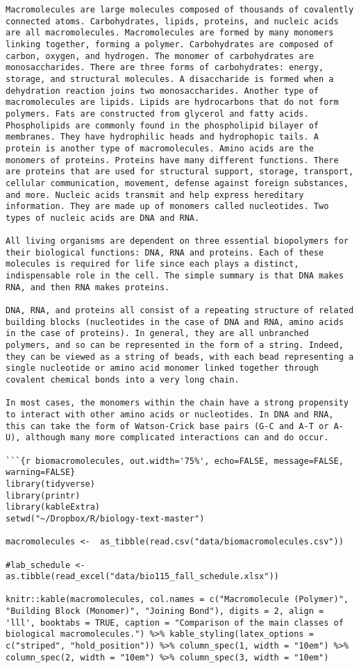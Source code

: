 \begin{verbatim}
Macromolecules are large molecules composed of thousands of covalently connected atoms. Carbohydrates, lipids, proteins, and nucleic acids are all macromolecules. Macromolecules are formed by many monomers linking together, forming a polymer. Carbohydrates are composed of carbon, oxygen, and hydrogen. The monomer of carbohydrates are monosaccharides. There are three forms of carbohydrates: energy, storage, and structural molecules. A disaccharide is formed when a dehydration reaction joins two monosaccharides. Another type of macromolecules are lipids. Lipids are hydrocarbons that do not form polymers. Fats are constructed from glycerol and fatty acids. Phospholipids are commonly found in the phospholipid bilayer of membranes. They have hydrophilic heads and hydrophopic tails. A protein is another type of macromolecules. Amino acids are the monomers of proteins. Proteins have many different functions. There are proteins that are used for structural support, storage, transport, cellular communication, movement, defense against foreign substances, and more. Nucleic acids transmit and help express hereditary information. They are made up of monomers called nucleotides. Two types of nucleic acids are DNA and RNA.

All living organisms are dependent on three essential biopolymers for their biological functions: DNA, RNA and proteins. Each of these molecules is required for life since each plays a distinct, indispensable role in the cell. The simple summary is that DNA makes RNA, and then RNA makes proteins.

DNA, RNA, and proteins all consist of a repeating structure of related building blocks (nucleotides in the case of DNA and RNA, amino acids in the case of proteins). In general, they are all unbranched polymers, and so can be represented in the form of a string. Indeed, they can be viewed as a string of beads, with each bead representing a single nucleotide or amino acid monomer linked together through covalent chemical bonds into a very long chain.

In most cases, the monomers within the chain have a strong propensity to interact with other amino acids or nucleotides. In DNA and RNA, this can take the form of Watson-Crick base pairs (G-C and A-T or A-U), although many more complicated interactions can and do occur.

```{r biomacromolecules, out.width='75%', echo=FALSE, message=FALSE, warning=FALSE}
library(tidyverse)
library(printr)        
library(kableExtra)
setwd("~/Dropbox/R/biology-text-master")

macromolecules <-  as_tibble(read.csv("data/biomacromolecules.csv"))

#lab_schedule <-  as.tibble(read_excel("data/bio115_fall_schedule.xlsx"))

knitr::kable(macromolecules, col.names = c("Macromolecule (Polymer)", "Building Block (Monomer)", "Joining Bond"), digits = 2, align = 'lll', booktabs = TRUE, caption = "Comparison of the main classes of biological macromolecules.") %>% kable_styling(latex_options = c("striped", "hold_position")) %>% column_spec(1, width = "10em") %>% column_spec(2, width = "10em") %>% column_spec(3, width = "10em") 
\end{verbatim}

